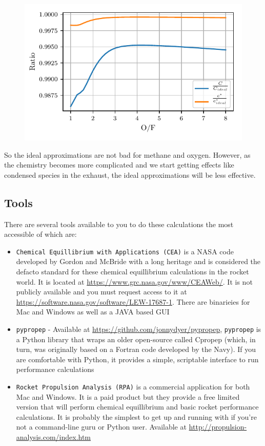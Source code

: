 \documentclass[twocolumn]{memoir} %
\begin{document}
%
\begin{figure}[H]
    \includegraphics[width=\columnwidth]{fzn_ideal_ppp}
\end{figure}

So the ideal approximations are not bad for methane and oxygen.  However, as the chemistry
becomes more complicated and we start getting effects like condensed species in the exhaust,
the ideal approximations will be less effective.

\subsection{Tools}
There are several tools available to you to do these calculations the most accessible of
which are:

\begin{itemize}
    \item \texttt{Chemical Equillibrium with Applications (CEA)} is a NASA code developed by 
        Gordon and McBride with a long heritage and
        is considered the defacto standard for these chemical equillibrium calculations in the rocket
        world.  It is located at \url{https://www.grc.nasa.gov/www/CEAWeb/}.  It is not publicly available
        and you must request access to it at \url{https://software.nasa.gov/software/LEW-17687-1}.  There
        are binarieies for Mac and Windows as well as a JAVA based GUI
    \item \texttt{pypropep} - Available at \url{https://github.com/jonnydyer/pypropep}, \texttt{pypropep} 
        is a Python library that wraps an older open-source called Cpropep (which, in turn, was
        originally based on a Fortran code developed by the Navy).  If you are comfortable with
        Python, it provides a simple, scriptable interface to run performance calculations
    \item \texttt{Rocket Propulsion Analysis (RPA)} is a commercial application for both Mac and
        Windows.  It is a paid product but they provide a free limited version that will perform 
        chemical equillibrium and basic rocket performance calculations.  It is probably the 
        simplest to get up and running with if you're not a command-line guru or Python user.  Available
        at \url{http://propulsion-analysis.com/index.htm}
\end{itemize}
\end{document}
